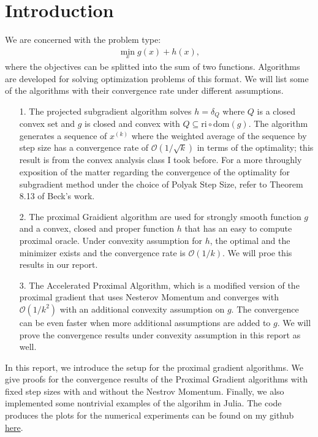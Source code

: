 \documentclass[]{article}
\theoremstyle{definition}
\begin{document}
\section{Introduction}
    We are concerned with the problem type: 
    \begin{align}
        \min_{x} g(x) + h(x),
    \end{align}
    where the objectives can be splitted into the sum of two functions. Algorithms are developed for solving optimization problems of this format. We will list some of the algorithms with their convergence rate under different assumptions. 
    \begin{enumerate}
        \item [1.] The projected subgradient algorithm solves $h = \delta_Q$ where $Q$ is a closed convex set and $g$ is closed and convex with $Q\subseteq\text{ri}\circ \text{dom}(g)$. The algorithm generates a sequence of $x^{(k)}$ where the weighted average of the sequence by step size has a convergence rate of $\mathcal O(1/\sqrt{k})$ in terms of the optimality; this result is from the convex analysis class I took before. For a more throughly exposition of the matter regarding the convergence of the optimality for subgradient method under the choice of Polyak Step Size, refer to Theorem 8.13 of Beck's work\cite{book:first_order_opt}. 
        \item [2.] The proximal Graidient algorithm are used for strongly smooth function $g$ and a convex, closed and proper function $h$ that has an easy to compute proximal oracle. Under convexity assumption for $h$, the optimal and the minimizer exists and the convergence rate is $\mathcal O(1/k)$. We will proe this results in our report. 
        \item [3.] The Accelerated Proximal Algorithm, which is a modified version of the proximal gradient that uses Nesterov Momentum and converges with $\mathcal O(1/k^2)$ with an additional convexity assumption on $g$. The convergence can be even faster when more additional assumptions are added to $g$. We will prove the convergence results under convexity assumption in this report as well.  
    \end{enumerate}
    In this report, we introduce the setup for the proximal gradient algorithms. We give proofs for the convergence results of the Proximal Gradient algorithms with fixed step sizes with and without the Nestrov Momentum. Finally, we also implemented some nontrivial examples of the algorihm in Julia. The code produces the plots for the numerical experiments can be found on my github \href{https://github.com/iluvjava/Proximal-Gradient}{here}. 
\end{document}
